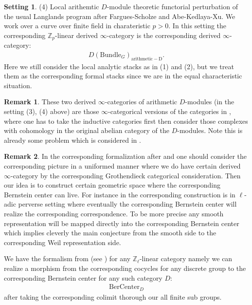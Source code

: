 \documentclass[12pt]{book}
\theoremstyle{definition}
\newtheorem{setting}{Setting}
\newtheorem{remark}{Remark}
\begin{document}
\begin{setting}
(4) Local arithemtic $D$-module theoretic functorial perturbation of the usual Langlands program after Fargues-Scholze and Abe-Kedlaya-Xu. We work over a curve over finite field in charateristic $p>0$. In this setting the corresponding $\mathbb{Z}_p$-linear derived $\infty$-category is the corresponding derived $\infty$-category:
\begin{align}
D(\mathrm{Bundle}_{G})_{\mathrm{arithmetic-D}}.
\end{align}
Here we still consider the local analytic stacks as in (1) and (2), but we treat them as the corresponding formal stacks since we are in the equal characteristic situation. 
\end{setting}


\begin{remark}
These two derived $\infty$-categories of arithmetic $D$-modules (in the setting (3), (4) above) are those $\infty$-categorical versions of the categories in \cite{AI}, where one has to take the inductive categories first then consider those complexes with cohomology in the original abelian category of the $D$-modules. Note this is already some problem which is considered in \cite{AI}.
\end{remark}

\begin{remark}
In the corresponding formalization after \cite{VLa} and \cite{FS} one should consider the corresponding picture in a uniformed manner where we do have certain derived $\infty$-category by the corresponding Grothendieck categorical consideration. Then our idea is to construct certain geometric space where the corresponding Bernstein center can live. For instance in \cite{VLa} the corresponding construction is in $\ell$-adic perverse setting where eventually the corresponding Bernstein center will realize the corresponding correspondence. To be more precise any smooth representation will be mapped directly into the corresponding Bernstein center which implies cleverly the main conjecture from the smooth side to the corresponding Weil representation side.
\end{remark}




We have the formalism from \cite{VLa} (see \cite[Chapter VIII Theorem 4.1 and Chapter IX Proposition 4.1]{FS}) for any $\mathbb{Z}_\ell$-linear category namely we can realize a morphism from the corresponding cocycles for any discrete group to the corresponding Bernstein center for any such category $D$:
\begin{align}
\mathrm{BerCenter}_D
\end{align}
after taking the corresponding colimit thorough our all finite sub groups. 
\end{document}
